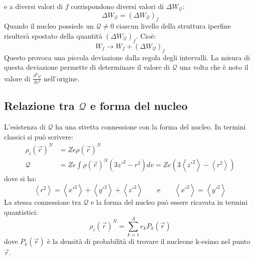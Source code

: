 e a diversi valori di $f$ corrispondono diversi valori di $\Delta W_{\mathcal{Q}}$:
\begin{equation}
\Delta W_{\mathcal{Q}} = \left( \Delta W_{\mathcal{Q}} \right)_f 
\end{equation}
Quando il nucleo possiede un $\mathcal{Q} \ne 0$ ciascun livello della struttura
iperfine risulterà spostato della quantità $\left( \Delta W_{\mathcal{Q}}
\right)_f$. Cioè:
\begin{equation}
W_f \rightarrow W_f + \left( \Delta W_{\mathcal{Q}} \right)_f
\end{equation}
Questo provoca una piccola deviazione dalla regola degli intervalli. La misura
di questa deviazione permette di determinare il valore di $\mathcal{Q}$ una
volta che è noto il valore di $\frac{\partial^2 \varphi}{\partial z^2}$
nell'origine.

\subsection{Relazione tra $\mathcal{Q}$ e forma del nucleo}
L'esistenza di $\mathcal{Q}$ ha una stretta connessione con la forma del nucleo.
In termini classici si può scrivere:
\begin{equation}
\begin{split}
\rho_c{(\vec{r})}^N &= Z e \rho{(\vec{r})}^N\\
\mathcal{Q} &= Z e \int \rho{(\vec{r})}^N (3z'^2 - r^2) dv = Z e (3 \left\langle z'^2 \right\rangle - \left\langle r^2 \right\rangle )
\end{split}
\end{equation}
dove si ha:
\begin{equation}
\left\langle r^2 \right\rangle  = \left\langle x'^2 \right\rangle + \left\langle y'^2 \right\rangle + \left\langle z'^2 \right\rangle \qquad \text{e} \qquad \left\langle x'^2 \right\rangle = \left\langle y'^2 \right\rangle
\end{equation}
La stessa connessione tra $\mathcal{Q}$ e la forma del nucleo può essere
ricavata in termini quantistici:
\begin{equation}
\rho_c{(\vec{r})}^N = \sum_{k=1}^A e_k P_k{(\vec{r})}
\end{equation}
dove $P_k{(\vec{r})}$ è la densità di probabilità di trovare il nucleone k-esimo nel punto $\vec{r}$.

